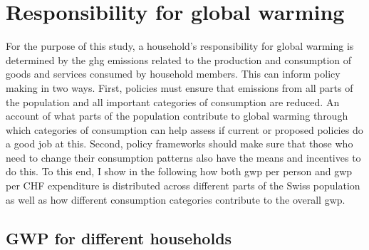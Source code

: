 \documentclass[referee, lineno, pdflatex,sn-apa]{sn-jnl}%
\theoremstyle{thmstyleone}%
\theoremstyle{thmstyletwo}%
\theoremstyle{thmstylethree}%
\begin{document}
\clearpage

\section{Responsibility for global warming}
\label{sec:gwp}

For the purpose of this study, a household's responsibility for global warming is determined by the \ac{ghg} emissions related to the production and consumption of goods and services consumed by household members.
This can inform policy making in two ways.
First, policies must ensure that emissions from all parts of the population and all important categories of consumption are reduced.
An account of what parts of the population contribute to global warming through which categories of consumption can help assess if current or proposed policies do a good job at this.
Second, policy frameworks should make sure that those who need to change their consumption patterns also have the means and incentives to do this.
To this end, I show in the following how both \ac{gwp} per person and \ac{gwp} per CHF expenditure is distributed across different parts of the Swiss population as well as how different consumption categories contribute to the overall \ac{gwp}.

\subsection{{GWP} for different households}
\end{document}
